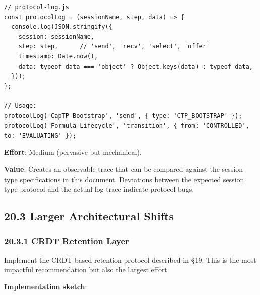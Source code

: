 \documentclass[11pt]{article}
\begin{document}
\begin{verbatim}
// protocol-log.js
const protocolLog = (sessionName, step, data) => {
  console.log(JSON.stringify({
    session: sessionName,
    step: step,      // 'send', 'recv', 'select', 'offer'
    timestamp: Date.now(),
    data: typeof data === 'object' ? Object.keys(data) : typeof data,
  }));
};

// Usage:
protocolLog('CapTP-Bootstrap', 'send', { type: 'CTP_BOOTSTRAP' });
protocolLog('Formula-Lifecycle', 'transition', { from: 'CONTROLLED', to: 'EVALUATING' });
\end{verbatim}

\textbf{Effort}: Medium (pervasive but mechanical).

\textbf{Value}: Creates an observable trace that can be compared against the
session type specifications in this document. Deviations between the
expected session type protocol and the actual log trace indicate protocol
bugs.
\subsection{20.3 Larger Architectural Shifts}
\label{sec:org6624b59}

\subsubsection{20.3.1 CRDT Retention Layer}
\label{sec:org6666850}

Implement the CRDT-based retention protocol described in §19. This is the
most impactful recommendation but also the largest effort.

\textbf{Implementation sketch}:
\end{document}
